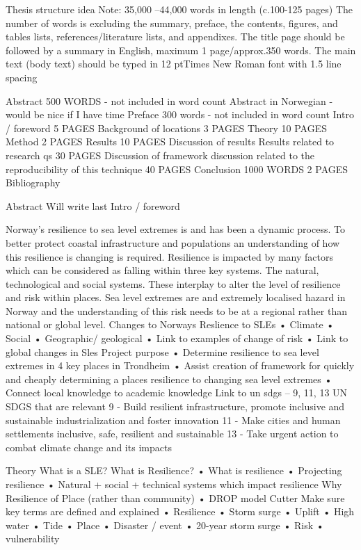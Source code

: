 Thesis structure idea 
Note: 35,000 –44,000 words in length (c.100-125 pages) 
The number of words is excluding the summary, preface, the contents, figures, and tables lists, references/literature lists, and appendixes. The title page should be followed by a summary in English, maximum 1 page/approx.350 words. 
The main text (body text) should be typed in 12 ptTimes New Roman font with 1.5 line 
spacing

Abstract
500 WORDS  - not included in word count
Abstract in Norwegian - would be nice if I have time
Preface
300 words - not included in word count
Intro / foreword 
5 PAGES
Background of locations
3 PAGES
Theory
10 PAGES
Method
2 PAGES
Results
10 PAGES 
Discussion of results
Results related to research qs
30 PAGES
Discussion of framework 
discussion related to the reproducibility of this technique
40 PAGES 
Conclusion 
1000 WORDS 2 PAGES
Bibliography

Abstract
Will write last
Intro / foreword

Norway’s resilience to sea level extremes is and has been a dynamic process. To better protect coastal infrastructure and populations an understanding of how this resilience is changing is required. Resilience is impacted by many factors which can be considered as falling within three key systems. The natural, technological and social systems. These interplay to alter the level of resilience and risk within places. Sea level extremes are and extremely localised hazard in Norway and the understanding of this risk needs to be at a regional rather than national or global level. 
Changes to Norways Reslience to SLEs
•	Climate
•	Social 
•	Geographic/ geological
•	Link to examples of change of risk
•	Link to global changes in Sles
Project purpose
•	Determine resilience to sea level extremes in 4 key places in Trondheim
•	Assist creation of framework for quickly and cheaply determining a places resilience to changing sea level extremes
•	Connect local knowledge to academic knowledge
Link to un sdgs – 9, 11, 13
UN SDGS that are relevant 
9 - Build resilient infrastructure, promote inclusive and sustainable industrialization and foster innovation
11 - Make cities and human settlements inclusive, safe, resilient and sustainable
13 - Take urgent action to combat climate change and its impacts


Theory
What is a SLE?
What is Resilience?
•	What is resilience
•	Projecting resilience
•	Natural + social + technical systems which impact resilience
Why Resilience of Place (rather than community)
•	DROP model Cutter
Make sure key terms are defined and explained
•	Resilience
•	Storm surge
•	Uplift
•	High water
•	Tide
•	Place
•	Disaster / event
•	20-year storm surge
•	Risk
•	vulnerability

